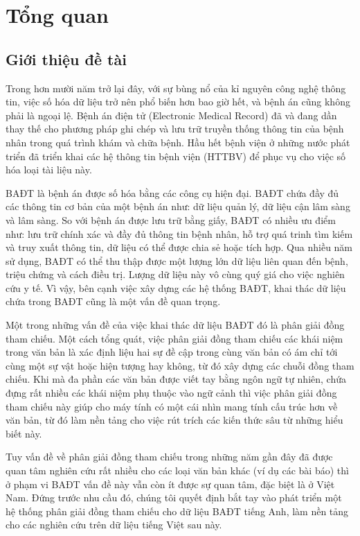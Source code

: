 \chapter{Tổng quan}
\section{Giới thiệu đề tài\label{gioithieudetai}}
Trong hơn mười năm trở lại đây, với sự bùng nổ của kỉ nguyên công nghệ thông tin, việc số hóa dữ liệu trở nên phổ biến hơn bao giờ hết, và bệnh án cũng không phải là ngoại lệ. Bệnh án điện tử (Electronic Medical Record) đã và đang dần thay thế cho phương pháp ghi chép và lưu trữ truyền thống thông tin của bệnh nhân trong quá trình khám và chữa bệnh. Hầu hết bệnh viện ở những nước phát triển đã triển khai các hệ thông tin bệnh viện (HTTBV) để phục vụ cho việc số hóa loại tài liệu này.

BAĐT là bệnh án được số hóa bằng các công cụ hiện đại. BAĐT chứa đầy đủ các thông tin cơ bản của một bệnh án như: dữ liệu quản lý, dữ liệu cận lâm sàng và lâm sàng. So với bệnh án được lưu trữ bằng giấy, BAĐT có nhiều ưu điểm như: lưu trữ chính xác và đầy đủ thông tin bệnh nhân, hỗ trợ quá trinh tìm kiếm và truy xuất thông tin, dữ liệu có thể được chia sẻ hoặc tích hợp. Qua nhiều năm sử dụng, BAĐT có thể thu thập được một lượng lớn dữ liệu liên quan đến bệnh, triệu chứng và cách điều trị. Lượng dữ liệu này vô cùng quý giá cho việc nghiên cứu y tế. Vì vậy, bên cạnh việc xây dựng các hệ thống BAĐT, khai thác dữ liệu chứa trong BAĐT cũng là một vấn đề quan trọng.

Một trong những vấn đề của việc khai thác dữ liệu BAĐT đó là phân giải đồng tham chiếu. Một cách tổng quát, việc phân giải đồng tham chiếu các khái niệm trong văn bản là xác định liệu hai sự đề cập trong cùng văn bản có ám chỉ tới cùng một sự vật hoặc hiện tượng hay không, từ đó xây dựng các chuỗi đồng tham chiếu. Khi mà đa phần các văn bản được viết tay bằng ngôn ngữ tự nhiên, chứa đựng rất nhiều các khái niệm phụ thuộc vào ngữ cảnh thì việc phân giải đồng tham chiếu này giúp cho máy tính có một cái nhìn mang tính cấu trúc hơn về văn bản, từ đó làm nền tảng cho việc rút trích các kiến thức sâu từ những hiểu biết này.

Tuy vấn đề về phân giải đồng tham chiếu trong những năm gần đây đã được quan tâm nghiên cứu rất nhiều cho các loại văn bản khác (ví dụ các bài báo) thì ở phạm vi BAĐT vấn đề này vẫn còn ít được sự quan tâm, đặc biệt là ở Việt Nam. Đứng trước nhu cầu đó, chúng tôi quyết định bắt tay vào phát triển một hệ thống phân giải đồng tham chiếu cho dữ liệu BAĐT tiếng Anh, làm nền tảng cho các nghiên cứu trên dữ liệu tiếng Việt sau này.

